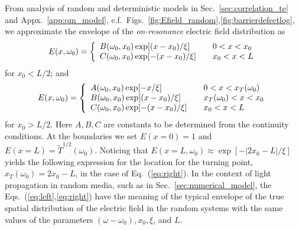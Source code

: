 From analysis of random and deterministic models in Sec.~\ref{sec:correlation_te} and Appx.~\ref{app:qm_model}, c.f.~Figs.~\ref{fig:Efield_random},\ref{fig:barrierdefectlog}, we approximate the envelope of the {\it on-resonance} electric field distribution as
\begin{equation}
E(x,\omega_0) = \left\{
\begin{array}{l l}
B(\omega_0,x_0) \exp [ (x-x_0)/\xi ] &\quad 0 < x < x_0 \\
C(\omega_0,x_0) \exp [-(x-x_0)/\xi ] &\quad x_0 < x < L\\
\end{array} \right.
\label{eq:left}
\end{equation}
for $x_0<L/2$; and
\begin{equation}
E(x,\omega_0) = \left\{
\begin{array}{l l}
 A(\omega_0,x_0) \exp [-x      /\xi ] &\quad 0 < x < x_T(\omega_0)   \\
 B(\omega_0,x_0) \exp [ (x-x_0)/\xi ] &\quad x_T(\omega_0) < x < x_0 \\
 C(\omega_0,x_0) \exp [-(x-x_0)/\xi ] &\quad x_0 < x < L \\
\end{array} \right.
\label{eq:right}
\end{equation}
for $x_0>L/2$. Here $A,B,C$ are constants to be determined from the continuity conditions. At the boundaries we set $E(x=0)=1$ and $E(x=L)=\tilde{T}^{1/2}(\omega_0)$. Noticing that $E(x=L,\omega_0)\approx\exp\left[ -|2x_0-L|/\xi\right]$ yields the following expression for the location for the turning point, $x_T(\omega_0)=2x_0-L$, in the case of Eq.~(\ref{eq:right}). In the context of light propagation in random media, such as in Sec.~\ref{sec:numerical_model}, the Eqs.~(\ref{eq:left},\ref{eq:right}) have the meaning of the typical envelope of the true spatial distribution of the electric field in the random systems with the same values of the parameters $(\omega-\omega_0),x_0,\xi$, and $L$.

